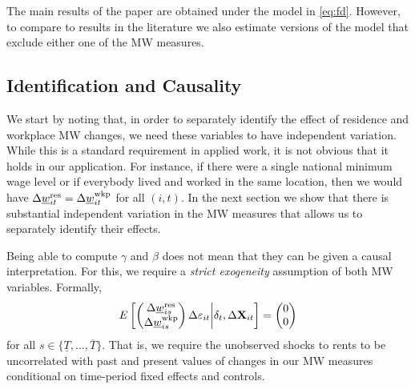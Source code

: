 The main results of the paper are obtained under the model in \eqref{eq:fd}. 
However, to compare to results in the literature we also estimate versions of 
the model that exclude either one of the MW measures.


\subsection{Identification and Causality}

We start by noting that, in order to separately identify the effect of 
residence and workplace MW changes, we need these variables to have independent
variation.
While this is a standard requirement in applied work, it is not obvious that it 
holds in our application.
For instance, if there were a single national minimum wage level or if everybody 
lived and worked in the same location, then we would have
$\Delta \underline{w}^{\text{res}}_{it} = \Delta \underline{w}^{\text{wkp}}_{it}$ for all $(i,t)$.
In the next section we show that there is substantial independent variation
in the MW measures that allows us to separately identify their effects.

Being able to compute $\gamma$ and $\beta$ does not mean that they can be given
a causal interpretation.
For this, we require a \textit{strict exogeneity} assumption of both MW 
variables.
Formally,
\begin{equation}\label{eq:strict_exogeneity}
    E\left[
        \begin{pmatrix}
            \Delta \underline{w}^{\text{res}}_{is} \\
            \Delta \underline{w}^{\text{wkp}}_{is} \\
        \end{pmatrix}
        \Delta \varepsilon_{it}
    \bigg| \delta_t, \Delta \mathbf{X}_{it} \right] =
    \begin{pmatrix}
        0 \\
        0 \\
    \end{pmatrix}
\end{equation}
for all $s\in\{\underline{T}, ..., \overline{T}\}$.
That is, we require the unobserved shocks to rents to be uncorrelated with 
past and present values of changes in our MW measures conditional on time-period 
fixed effects and controls.

